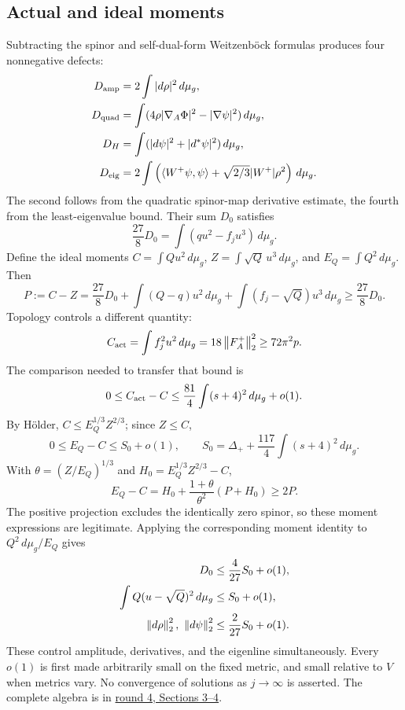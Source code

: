 \documentclass[11pt,a4paper]{article}
\theoremstyle{definition}
\theoremstyle{remark}
\newcommand{\dd}{\,d\mu_g}
\newcommand{\norm}[1]{\left\|#1\right\|}
\newcommand{\roundref}[2]{\href{run:../references/rounds/#1}{#2}}
\numberwithin{equation}{section}
\begin{document}
\subsection{Actual and ideal moments}\label{sub:moments}
Subtracting the spinor and self-dual-form Weitzenb\"ock formulas produces
four nonnegative defects:
\begin{align}
 D_{\rm amp}&=2\int|d\rho|^2\dd,\notag\\
 D_{\rm quad}&=\int(4\rho|\nabla_A\Phi|^2-|\nabla\psi|^2)\dd,\notag\\
 D_H&=\int(|d\psi|^2+|d^*\psi|^2)\dd,\notag\\
 D_{\rm eig}&=2\int\left(\langle W^+\psi,\psi\rangle+
                                 \sqrt{2/3}|W^+|\rho^2\right)\dd.
                                                        \label{eq:four-defects}
\end{align}
The second follows from the quadratic spinor-map derivative estimate,
the fourth from the least-eigenvalue bound. Their sum $D_0$ satisfies
\begin{equation}\label{eq:exact-defect}
                   \frac{27}{8}D_0=\int(qu^2-f_ju^3)\dd.
\end{equation}
Define the ideal moments
$C=\int Qu^2\dd$, $Z=\int\sqrt Q\,u^3\dd$, and
$E_Q=\int Q^2\dd$. Then
\[
 P:=C-Z=\frac{27}{8}D_0+
       \int(Q-q)u^2\dd+\int(f_j-\sqrt Q)u^3\dd\ge\frac{27}{8}D_0.
\]
Topology controls a different quantity:
\begin{equation}\label{eq:actual-moment}
 C_{\rm act}=\int f_j^2u^2\dd=18\norm{F_A^+}_2^2\ge72\pi^2p.
\end{equation}
The comparison needed to transfer that bound is
\[
 0\le C_{\rm act}-C\le\frac{81}{4}\int(s+4)^2\dd+o(1).
\]
By H\"older, $C\le E_Q^{1/3}Z^{2/3}$; since $Z\le C$,
\[
 0\le E_Q-C\le S_0+o(1),\qquad
 S_0=\Delta_++\frac{117}{4}\int(s+4)^2\dd.
\]
With $\theta=(Z/E_Q)^{1/3}$ and $H_0=E_Q^{1/3}Z^{2/3}-C$,
\[
 E_Q-C=H_0+\frac{1+\theta}{\theta^2}(P+H_0)\ge2P.
\]
The positive projection excludes the identically zero spinor, so these
moment expressions are legitimate. Applying the corresponding moment
identity to $Q^2\dd/E_Q$ gives
\begin{align}
 D_0&\le\frac4{27}S_0+o(1),\notag\\
 \int Q(u-\sqrt Q)^2\dd&\le S_0+o(1),\notag\\
 \norm{d\rho}_2^2,\ \norm{d\psi}_2^2&\le\frac2{27}S_0+o(1).
                                                        \label{eq:moment-estimates}
\end{align}
These control amplitude, derivatives, and the eigenline simultaneously.
Every $o(1)$ is first made arbitrarily small on the fixed metric, and
small relative to $V$ when metrics vary. No convergence of solutions as
$j\to\infty$ is asserted. The complete algebra is in
\roundref{round4_rigidity.md}{round 4, Sections 3--4}.
\end{document}
